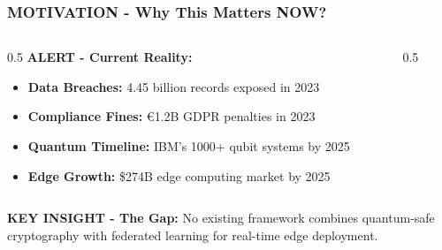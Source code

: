\documentclass[aspectratio=169]{beamer}
\begin{document}
\begin{frame}
    \frametitle{MOTIVATION - Why This Matters NOW?}
    \begin{columns}
        \begin{column}{0.5\textwidth}
            \textbf{ALERT - Current Reality:}
            \begin{itemize}
                \item \textbf{Data Breaches:} 4.45 billion records exposed in 2023
                \item \textbf{Compliance Fines:} €1.2B GDPR penalties in 2023
                \item \textbf{Quantum Timeline:} IBM's 1000+ qubit systems by 2025
                \item \textbf{Edge Growth:} \$274B edge computing market by 2025
            \end{itemize}
        \end{column}
        \begin{column}{0.5\textwidth}
        \end{column}
    \end{columns}
    
    \vspace{0.5cm}
    \textbf{KEY INSIGHT - The Gap:} No existing framework combines quantum-safe cryptography with federated learning for real-time edge deployment.
\end{frame}
\end{document}

